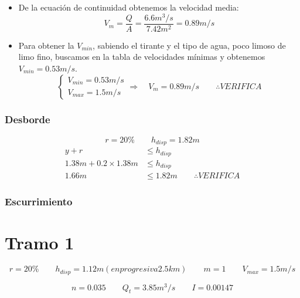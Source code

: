 \documentclass[10.5pt]{article}
\begin{document}
\begin{itemize}
 \item De la ecuación de continuidad obtenemos la velocidad media:
    \begin{equation*}
    V_{m} = \dfrac{Q}{A} = \dfrac{6.6 m^3/s}{7.42 m^2} = 0.89 m/s
    \end{equation*}
 \item Para obtener la $V_{min}$, sabiendo el tirante y el tipo de agua, poco limoso de limo fino, buscamos en
 la tabla de velocidades mínimas y obtenemos $V_{min} = 0.53 m/s$.
    \begin{equation*}
      \begin{cases}
      V_{min} = 0.53 m/s \\
      V_{max} = 1.5 m/s
      \end{cases}
      \Longrightarrow \quad
      V_{m} = 0.89 m/s
      \qquad
      \therefore VERIFICA
    \end{equation*}
\end{itemize}

\subsubsection*{Desborde}

\begin{equation*}
 r = 20\%
 \qquad
 h_{disp} = 1.82 m
\end{equation*}
\begin{align*}
 y + r &\leq h_{disp} \\
 1.38 m + 0.2 \times 1.38 m &\leq h_{disp} \\
 1.66 m &\leq 1.82 m
 \qquad
 \therefore VERIFICA
\end{align*}

\subsubsection*{Escurrimiento}


\section*{Tramo 1}


\begin{equation*}
  r = 20\%
 \qquad
  h_{disp} = 1.12 m (en progresiva 2.5 km)
 \qquad
  m = 1
 \qquad
  V_{max} = 1.5 m/s
\end{equation*}

\begin{equation*}
  n = 0.035
 \qquad
  Q_{t} = 3.85 m^3/s
 \qquad
  I = 0.00147
\end{equation*}
\end{document}
